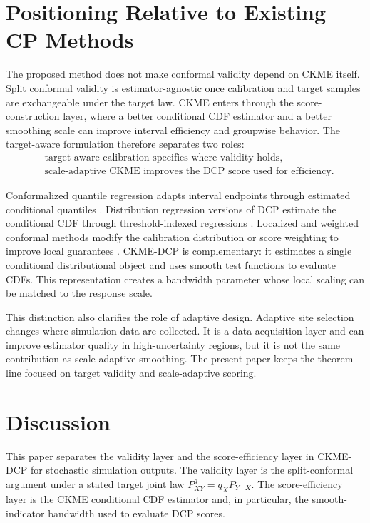 \documentclass[11pt]{article}
\begin{document}
\section{Positioning Relative to Existing CP Methods}
\label{sec:positioning}

The proposed method does not make conformal validity depend on CKME itself. Split conformal validity is estimator-agnostic once calibration and target samples are exchangeable under the target law. CKME enters through the score-construction layer, where a better conditional CDF estimator and a better smoothing scale can improve interval efficiency and groupwise behavior. The target-aware formulation therefore separates two roles:
\[
  \begin{aligned}
  &\text{target-aware calibration specifies where validity holds,}\\
  &\text{scale-adaptive CKME improves the DCP score used for efficiency.}
  \end{aligned}
\]

Conformalized quantile regression adapts interval endpoints through estimated conditional quantiles \cite{romano2019}. Distribution regression versions of DCP estimate the conditional CDF through threshold-indexed regressions \cite{chernozhukov2021}. Localized and weighted conformal methods modify the calibration distribution or score weighting to improve local guarantees \cite{tibshirani2019,hore2025}. CKME-DCP is complementary: it estimates a single conditional distributional object and uses smooth test functions to evaluate CDFs. This representation creates a bandwidth parameter whose local scaling can be matched to the response scale.

This distinction also clarifies the role of adaptive design. Adaptive site selection changes where simulation data are collected. It is a data-acquisition layer and can improve estimator quality in high-uncertainty regions, but it is not the same contribution as scale-adaptive smoothing. The present paper keeps the theorem line focused on target validity and scale-adaptive scoring.

\section{Discussion}
\label{sec:discussion}

This paper separates the validity layer and the score-efficiency layer in CKME-DCP for stochastic simulation outputs. The validity layer is the split-conformal argument under a stated target joint law \(P^q_{XY}=q_XP_{Y\mid X}\). The score-efficiency layer is the CKME conditional CDF estimator and, in particular, the smooth-indicator bandwidth used to evaluate DCP scores.
\end{document}
